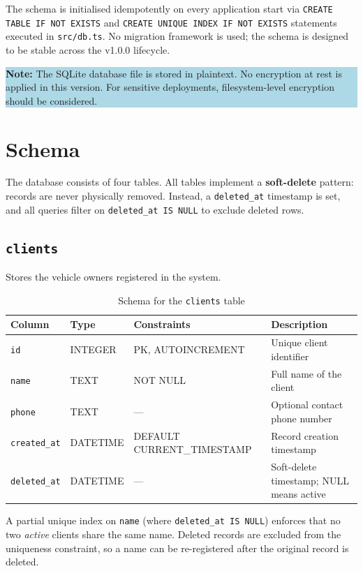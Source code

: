 \documentclass[12pt, a4paper]{report}
\newcommand{\infobox}[1]{%
	\vspace{6pt}
	\noindent
	\colorbox{LightBlue}{%
		\begin{minipage}{\dimexpr\linewidth-2\fboxsep}%
			\vspace{4pt}
			\small #1
			\vspace{4pt}
		\end{minipage}%
	}
	\vspace{6pt}
}
\begin{document}
	The schema is initialised idempotently on every application start via
	\texttt{CREATE TABLE IF NOT EXISTS} and \texttt{CREATE UNIQUE INDEX IF NOT EXISTS}
	statements executed in \texttt{src/db.ts}. No migration framework is used;
	the schema is designed to be stable across the v1.0.0 lifecycle.

	\infobox{\textbf{Note:} The SQLite database file is stored in plaintext.
		No encryption at rest is applied in this version. For sensitive
		deployments, filesystem-level encryption should be considered.}

	\section{Schema}
	The database consists of four tables. All tables implement a
	\textbf{soft-delete} pattern: records are never physically removed.
	Instead, a \texttt{deleted\_at} timestamp is set, and all queries
	filter on \texttt{deleted\_at IS NULL} to exclude deleted rows.

	\subsection{\texttt{clients}}
	Stores the vehicle owners registered in the system.

	\begin{table}[H]
		\centering
		\begin{tabularx}{\textwidth}{l l l X}
			\toprule
			\textbf{Column}    & \textbf{Type}   & \textbf{Constraints}   & \textbf{Description} \\
			\midrule
			\texttt{id}         & INTEGER & PK, AUTOINCREMENT      & Unique client identifier \\
			\texttt{name}       & TEXT    & NOT NULL               & Full name of the client \\
			\texttt{phone}      & TEXT    & ---                    & Optional contact phone number \\
			\texttt{created\_at} & DATETIME & DEFAULT CURRENT\_TIMESTAMP & Record creation timestamp \\
			\texttt{deleted\_at} & DATETIME & ---                   & Soft-delete timestamp; NULL means active \\
			\bottomrule
		\end{tabularx}
		\caption{Schema for the \texttt{clients} table}
		\label{tab:clients}
	\end{table}

	A partial unique index on \texttt{name} (where \texttt{deleted\_at IS NULL})
	enforces that no two \emph{active} clients share the same name. Deleted
	records are excluded from the uniqueness constraint, so a name can be
	re-registered after the original record is deleted.
\end{document}

